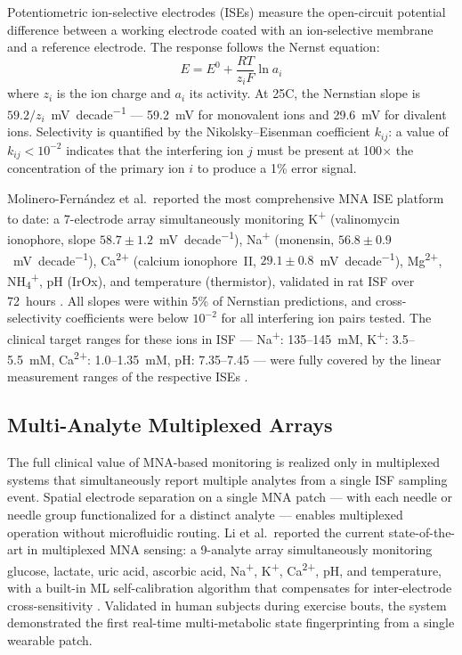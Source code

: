 \documentclass[review,1p]{elsarticle}
\begin{document}
Potentiometric ion-selective electrodes (ISEs) measure the open-circuit potential difference between a working electrode coated with an ion-selective membrane and a reference electrode. The response follows the Nernst equation:
\begin{equation}
E = E^0 + \frac{RT}{z_i F}\ln a_i
\label{eq:nernst}
\end{equation}
where $z_i$ is the ion charge and $a_i$ its activity. At 25\textdegree{}C, the Nernstian slope is $59.2/z_i$~mV~decade\textsuperscript{$-1$} — 59.2~mV for monovalent ions and 29.6~mV for divalent ions. Selectivity is quantified by the Nikolsky--Eisenman coefficient $k_{ij}$: a value of $k_{ij} < 10^{-2}$ indicates that the interfering ion $j$ must be present at 100$\times$ the concentration of the primary ion $i$ to produce a 1\% error signal.

Molinero-Fern\'{a}ndez et al.\ reported the most comprehensive MNA ISE platform to date: a 7-electrode array simultaneously monitoring K\textsuperscript{+} (valinomycin ionophore, slope $58.7 \pm 1.2$~mV~decade\textsuperscript{$-1$}), Na\textsuperscript{+} (monensin, $56.8 \pm 0.9$~mV~decade\textsuperscript{$-1$}), Ca\textsuperscript{2+} (calcium ionophore~II, $29.1 \pm 0.8$~mV~decade\textsuperscript{$-1$}), Mg\textsuperscript{2+}, NH\textsubscript{4}\textsuperscript{+}, pH (IrOx), and temperature (thermistor), validated in rat ISF over 72~hours \cite{MolineroFernandez2023}. All slopes were within 5\% of Nernstian predictions, and cross-selectivity coefficients were below $10^{-2}$ for all interfering ion pairs tested. The clinical target ranges for these ions in ISF — Na\textsuperscript{+}: 135--145~mM, K\textsuperscript{+}: 3.5--5.5~mM, Ca\textsuperscript{2+}: 1.0--1.35~mM, pH: 7.35--7.45 — were fully covered by the linear measurement ranges of the respective ISEs \cite{MolineroFernandez2023}.

\subsection{Multi-Analyte Multiplexed Arrays}
\label{subsec:multiplexed}

The full clinical value of MNA-based monitoring is realized only in multiplexed systems that simultaneously report multiple analytes from a single ISF sampling event. Spatial electrode separation on a single MNA patch — with each needle or needle group functionalized for a distinct analyte — enables multiplexed operation without microfluidic routing. Li et al.\ reported the current state-of-the-art in multiplexed MNA sensing: a 9-analyte array simultaneously monitoring glucose, lactate, uric acid, ascorbic acid, Na\textsuperscript{+}, K\textsuperscript{+}, Ca\textsuperscript{2+}, pH, and temperature, with a built-in ML self-calibration algorithm that compensates for inter-electrode cross-sensitivity \cite{Li2025Innovation}. Validated in human subjects during exercise bouts, the system demonstrated the first real-time multi-metabolic state fingerprinting from a single wearable patch.
\end{document}
